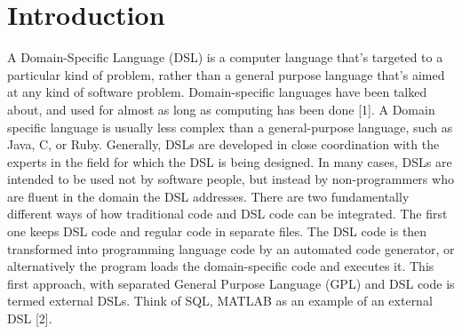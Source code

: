 \chapter*{Introduction}

A Domain-Specific Language (DSL) is a computer language that's targeted to a particular kind of problem, rather than a general purpose language that's aimed at any kind of software problem. Domain-specific languages have been talked about, and used for almost as long as computing has been done [1].
A Domain specific language is usually less complex than a general-purpose language, such as Java, C, or Ruby. Generally, DSLs are developed in close coordination with the experts in the field for which the DSL is being designed. In many cases, DSLs are intended to be used not by software people, but instead by non-programmers who are fluent in the domain the DSL addresses.
There are two fundamentally different ways of how traditional code and DSL code can be integrated. The first one keeps DSL code and regular code in separate files. The DSL code is then transformed into programming language code by an automated code generator, or alternatively the program loads the domain-specific code and executes it. This first approach, with separated General Purpose Language (GPL) and DSL code is termed external DSLs. Think of SQL, MATLAB as an example of an external DSL [2].
